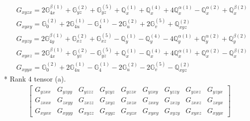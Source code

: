 \documentclass[fleqn,8pt,landscape]{jsarticle}
\begin{document}
\begin{align*}
& G_{xyzx} = 2 \mathbb{G}_{4x}^{\beta(1)} + \mathbb{G}_{yz}^{(2)} + \mathbb{G}_{yz}^{(5)} + \mathbb{Q}_{x}^{(1)} + \mathbb{Q}_{x}^{(4)} + 4 \mathbb{Q}_{x}^{\alpha(1)} - \mathbb{Q}_{x}^{\alpha(2)} + \mathbb{Q}_{x}^{\beta(2)} \\
& G_{xyxy} = \mathbb{G}_{0}^{(2)} + 2 \mathbb{G}_{4u}^{(1)} - \mathbb{G}_{4}^{(1)} - 2 \mathbb{G}_{u}^{(2)} + 2 \mathbb{G}_{v}^{(5)} + \mathbb{Q}_{xyz}^{(2)} \\
& G_{xyzy} = 2 \mathbb{G}_{4y}^{\beta(1)} + \mathbb{G}_{xz}^{(2)} + \mathbb{G}_{xz}^{(5)} - \mathbb{Q}_{y}^{(1)} - \mathbb{Q}_{y}^{(4)} - 4 \mathbb{Q}_{y}^{\alpha(1)} + \mathbb{Q}_{y}^{\alpha(2)} + \mathbb{Q}_{y}^{\beta(2)} \\
& G_{xyxz} = 2 \mathbb{G}_{4x}^{\beta(1)} + \mathbb{G}_{yz}^{(2)} - \mathbb{G}_{yz}^{(5)} + \mathbb{Q}_{x}^{(1)} - \mathbb{Q}_{x}^{(4)} + 4 \mathbb{Q}_{x}^{\alpha(1)} + \mathbb{Q}_{x}^{\alpha(2)} - \mathbb{Q}_{x}^{\beta(2)} \\
& G_{xyyx} = \mathbb{G}_{0}^{(2)} + 2 \mathbb{G}_{4u}^{(1)} - \mathbb{G}_{4}^{(1)} - 2 \mathbb{G}_{u}^{(2)} - 2 \mathbb{G}_{v}^{(5)} - \mathbb{Q}_{xyz}^{(2)}
\end{align*}
* Rank 4 tensor (a).
\begin{align*}
\begin{bmatrix} G_{yzxx} & G_{yzyy} & G_{yzzz} & G_{yzyz} & G_{yzzx} & G_{yzxy} & G_{yzzy} & G_{yzxz} & G_{yzyx} \\ G_{zxxx} & G_{zxyy} & G_{zxzz} & G_{zxyz} & G_{zxzx} & G_{zxxy} & G_{zxzy} & G_{zxxz} & G_{zxyx} \\ G_{xyxx} & G_{xyyy} & G_{xyzz} & G_{xyyz} & G_{xyzx} & G_{xyxy} & G_{xyzy} & G_{xyxz} & G_{xyyx} \end{bmatrix}
\end{align*}
\end{document}
